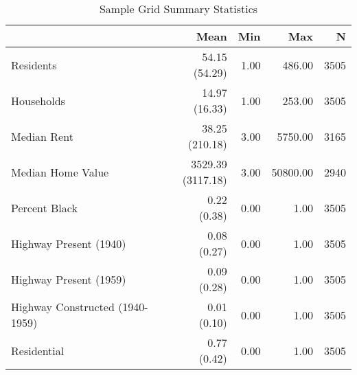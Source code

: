 \begin{table}[h]
\centering
\caption{Sample Grid Summary Statistics}
\label{tab:summary_stats}
\begin{tabular*}{\linewidth}{@{\extracolsep{\fill}}l*{4}{r}}
\toprule
 & Mean & Min & Max & N \\
\midrule
Residents & \makecell[tr]{54.15 \\ (54.29)} & 1.00 & 486.00 & 3505 \\
Households & \makecell[tr]{14.97 \\ (16.33)} & 1.00 & 253.00 & 3505 \\
Median Rent & \makecell[tr]{38.25 \\ (210.18)} & 3.00 & 5750.00 & 3165 \\
Median Home Value & \makecell[tr]{3529.39 \\ (3117.18)} & 3.00 & 50800.00 & 2940 \\
Percent Black & \makecell[tr]{0.22 \\ (0.38)} & 0.00 & 1.00 & 3505 \\
Highway Present (1940) & \makecell[tr]{0.08 \\ (0.27)} & 0.00 & 1.00 & 3505 \\
Highway Present (1959) & \makecell[tr]{0.09 \\ (0.28)} & 0.00 & 1.00 & 3505 \\
Highway Constructed (1940-1959) & \makecell[tr]{0.01 \\ (0.10)} & 0.00 & 1.00 & 3505 \\
Residential & \makecell[tr]{0.77 \\ (0.42)} & 0.00 & 1.00 & 3505 \\
\bottomrule
\end{tabular*}
\end{table}
